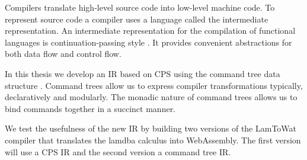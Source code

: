 
Compilers translate high-level source code into low-level machine code. To represent source code a compiler uses a language called the intermediate representation. An intermediate representation for the compilation of functional languages is continuation-passing style \autocite{steele1978rabbit, DBLP:books/daglib/0022396}. It provides convenient abstractions for both data flow and control flow.

In this thesis we develop an IR based on CPS using the command tree data structure \autocite{commandtreespoulsen}. Command trees allow us to express compiler transformations typically, declaratively and modularly. The monadic nature of command trees allows us to bind commands together in a succinct manner.

We test the usefulness of the new IR by building two versions of the LamToWat compiler that translates the lamdba calculus into WebAssembly. The first version will use a CPS IR and the second version a command tree IR.